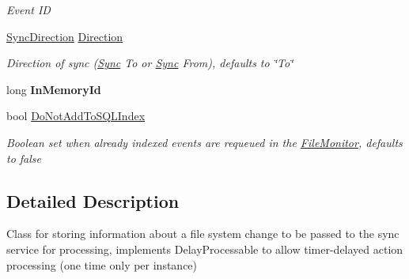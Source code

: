 \begin{DoxyCompactItemize}
\begin{DoxyCompactList}\small\item\em Event I\-D \end{DoxyCompactList}\item 
\hyperlink{namespace_cloud_api_public_1_1_static_a8ba5d1f6d06fa058730616f021c8974f}{Sync\-Direction} \hyperlink{class_cloud_api_public_1_1_model_1_1_file_change_ae9286566d391fe9d646db55e20b1ccab}{Direction}
\begin{DoxyCompactList}\small\item\em Direction of sync (\hyperlink{namespace_cloud_api_public_1_1_sync}{Sync} To or \hyperlink{namespace_cloud_api_public_1_1_sync}{Sync} From), defaults to \char`\"{}\-To\char`\"{} \end{DoxyCompactList}\item 
\hypertarget{class_cloud_api_public_1_1_model_1_1_file_change_a150bd50fceae6c179f1bc34debb933e5}{long {\bfseries In\-Memory\-Id}}\label{class_cloud_api_public_1_1_model_1_1_file_change_a150bd50fceae6c179f1bc34debb933e5}

\item 
bool \hyperlink{class_cloud_api_public_1_1_model_1_1_file_change_aa979e65ac9cd9783870afe5b25137296}{Do\-Not\-Add\-To\-S\-Q\-L\-Index}
\begin{DoxyCompactList}\small\item\em Boolean set when already indexed events are requeued in the \hyperlink{namespace_cloud_api_public_1_1_file_monitor}{File\-Monitor}, defaults to false \end{DoxyCompactList}\end{DoxyCompactItemize}


\subsection{Detailed Description}
Class for storing information about a file system change to be passed to the sync service for processing, implements Delay\-Processable to allow timer-\/delayed action processing (one time only per instance) 




